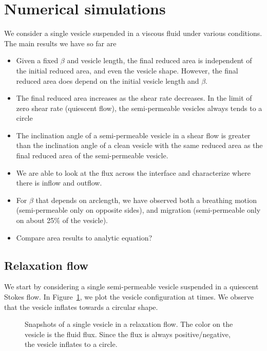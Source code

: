 \documentclass[twoside,twocolumn,9pt]{article}
\begin{document}
\section{Numerical simulations}
We consider a single vesicle suspended in a viscous fluid under various
conditions.  The main results we have so far are
\begin{itemize}
  \item Given a fixed $\beta$ and vesicle length, the final reduced area
    is independent of the initial reduced area, and even the vesicle
    shape. However, the final reduced area does depend on the initial
    vesicle length and $\beta$.
    
  \item The final reduced area increases as the shear rate decreases. In
    the limit of zero shear rate (quiescent flow), the semi-permeable
    vesicles always tends to a circle

  \item The inclination angle of a semi-permeable vesicle in a shear
    flow is greater than the inclination angle of a clean vesicle with
    the same reduced area as the final reduced area of the
    semi-permeable vesicle.

  \item We are able to look at the flux across the interface and
    characterize where there is inflow and outflow.

  \item For $\beta$ that depends on arclength, we have observed both a
    breathing motion (semi-permeable only on opposite sides), and
    migration (semi-permeable only on about 25\% of the vesicle).
    
  \item Compare area results to analytic equation?
\end{itemize}

\subsection{Relaxation flow}
We start by considering a single semi-permeable vesicle suspended in a
quiescent Stokes flow. In Figure~\ref{fig:relaxationSnapshots}, we plot
the vesicle configuration at  times. We observe that
the vesicle inflates towards a circular shape. 

\begin{figure}[htp]
  \caption{\label{fig:relaxationSnapshots} Snapshots of a single vesicle
  in a relaxation flow. The color on the vesicle is the fluid flux.
  Since the flux is always positive/negative, the vesicle inflates to a
  circle.}
\end{figure}
\end{document}
